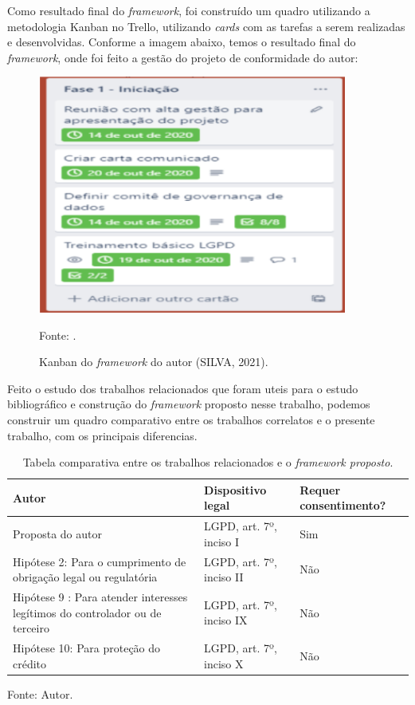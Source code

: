 \documentclass[
	12pt,				%
	openright,			%
	oneside,			%
	a4paper,			%
	english,			%
	french,				%
	spanish,			%
	brazil,				%
	]{abntex2}
\begin{document}
Como resultado final do \textit{framework}, foi construído um quadro utilizando a metodologia Kanban no Trello, utilizando \textit{cards} com as tarefas a serem realizadas e desenvolvidas. Conforme a imagem abaixo, temos o resultado final do \textit{framework}, onde foi feito a gestão do projeto de conformidade do autor:

\begin{figure}[ht]
    \centering
    \caption{Kanban do \textit{framework} do autor (SILVA, 2021).}
    \includegraphics[width=4.0in]{Images/17Silva2021.png}
    \label{fig: grafico-acc}
    
    \centering \small Fonte: \cite{silva2021}.
\end{figure}

Feito o estudo dos trabalhos relacionados que foram uteis para o estudo bibliográfico e construção do \textit{framework}  proposto nesse trabalho, podemos construir um quadro comparativo entre os trabalhos correlatos e o presente trabalho, com os principais diferencias.
\begin{table}[ht]
    \centering
    \caption{Tabela comparativa entre os trabalhos relacionados e o \textit{framework proposto}.}
    \label{tab: requisitos de tratamento de dados}
    \begin{tabular}{|p{5.5 cm}|p{4.5cm}|p{5.5cm}|} 
        \hline
        \textbf{Autor} & \textbf{Dispositivo legal} & \textbf{Requer consentimento?} \\ \hline
        
         Proposta do autor & LGPD, art. 7º, inciso I & Sim \\ \hline
         
        Hipótese 2: Para o cumprimento de obrigação legal ou regulatória & LGPD, art. 7º, inciso II & Não  \\ \hline
        
        Hipótese 9 : Para atender interesses legítimos do controlador ou de terceiro & LGPD, art. 7º, inciso IX & Não  \\ \hline
        
        Hipótese 10: Para proteção do crédito & LGPD, art. 7º, inciso X & Não  \\ \hline
    \end{tabular}
    \newline \newline Fonte: Autor.
\end{table}
\end{document}
